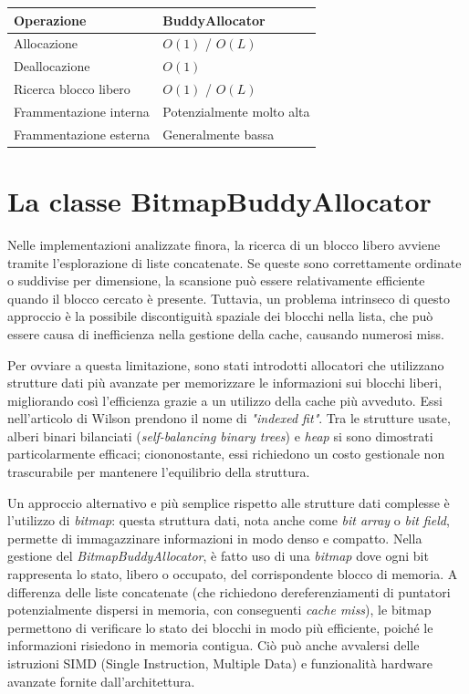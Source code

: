 \begin{center}
\begin{tabular}{|l|l|}
\hline
Operazione & BuddyAllocator \\
\hline
Allocazione & $O(1)$ / $O(L)$ \\
Deallocazione & $O(1)$ \\
Ricerca blocco libero & $O(1)$ / $O(L)$ \\
Frammentazione interna & Potenzialmente molto alta \\
Frammentazione esterna & Generalmente bassa \\
\hline
\end{tabular}
\end{center}

\section{La classe BitmapBuddyAllocator}
Nelle implementazioni analizzate finora, la ricerca di un blocco libero avviene tramite l'esplorazione di liste concatenate. Se queste sono correttamente ordinate o suddivise per dimensione, la scansione può essere relativamente efficiente quando il blocco cercato è presente. Tuttavia, un problema intrinseco di questo approccio è la possibile discontiguità spaziale dei blocchi nella lista, che può essere causa di inefficienza nella gestione della cache, causando numerosi miss.

Per ovviare a questa limitazione, sono stati introdotti allocatori che utilizzano strutture dati più avanzate per memorizzare le informazioni sui blocchi liberi, migliorando così l’efficienza grazie a un utilizzo della cache più avveduto. Essi nell’articolo di Wilson prendono il nome di \textit{"indexed fit"}. Tra le strutture usate, alberi binari bilanciati (\textit{self-balancing binary trees}) e \textit{heap} si sono dimostrati particolarmente efficaci; ciononostante, essi richiedono un costo gestionale non trascurabile per mantenere l’equilibrio della struttura.

Un approccio alternativo e più semplice rispetto alle strutture dati complesse è l’utilizzo di \textit{bitmap}: questa struttura dati, nota anche come \textit{bit array} o \textit{bit field}, permette di immagazzinare informazioni in modo denso e compatto.  Nella gestione del \textit{BitmapBuddyAllocator}, è fatto uso di una \textit{bitmap} dove ogni bit rappresenta lo stato, libero o occupato, del corrispondente blocco di memoria. A differenza delle liste concatenate (che richiedono dereferenziamenti di puntatori potenzialmente dispersi in memoria, con conseguenti \textit{cache miss}), le bitmap permettono di verificare lo stato dei blocchi in modo più efficiente, poiché le informazioni risiedono in memoria contigua. Ciò può anche avvalersi delle istruzioni SIMD (Single Instruction, Multiple Data) e funzionalità hardware avanzate fornite dall’architettura.

